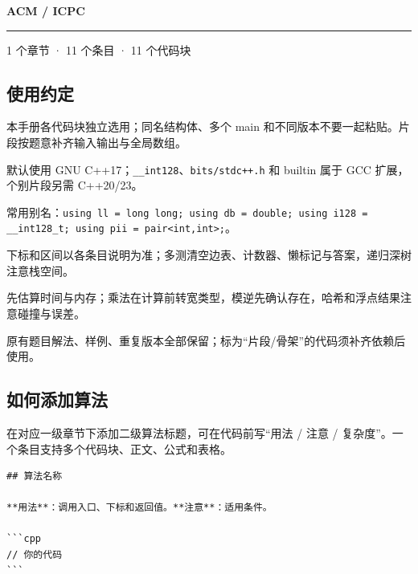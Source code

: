 \documentclass[a4paper,9pt]{extarticle}
\begin{document}
\thispagestyle{empty}
\vspace*{12mm}
{\Huge\bfseries\sffamily\color{accent}ACM / ICPC}\par
\vspace{3mm}{\Large\sffamily 算法模板手册}\par
{}\par
\vspace{5mm}\hrule\vspace{4mm}
1 个章节 · 11 个条目 · 11 个代码块\par\medskip


\subsection*{使用约定}

本手册各代码块独立选用；同名结构体、多个 main 和不同版本不要一起粘贴。片段按题意补齐输入输出与全局数组。

\noindent\textbullet\enspace 默认使用 GNU C++17；\texttt{\_\_int128}、\texttt{bits/\allowbreak{}stdc+\allowbreak{}+\allowbreak{}.\allowbreak{}h} 和 builtin 属于 GCC 扩展，个别片段另需 C+\allowbreak{}+\allowbreak{}20/\allowbreak{}23。\par
\noindent\textbullet\enspace 常用别名：\texttt{using ll = long long; using db = double; using i128 = \_\_int128\_t; using pii = pair<\allowbreak{}int,\allowbreak{}int>\allowbreak{};}。\par
\noindent\textbullet\enspace 下标和区间以各条目说明为准；多测清空边表、计数器、懒标记与答案，递归深树注意栈空间。\par
\noindent\textbullet\enspace 先估算时间与内存；乘法在计算前转宽类型，模逆先确认存在，哈希和浮点结果注意碰撞与误差。\par
\noindent\textbullet\enspace 原有题目解法、样例、重复版本全部保留；标为“片段/骨架”的代码须补齐依赖后使用。\par

\subsection*{如何添加算法}

在对应一级章节下添加二级算法标题，可在代码前写“用法 / 注意 / 复杂度”。一个条目支持多个代码块、正文、公式和表格。

\begin{lstlisting}[language={}]
## 算法名称

**用法**：调用入口、下标和返回值。**注意**：适用条件。

```cpp
// 你的代码
```
\end{lstlisting}
\end{document}
